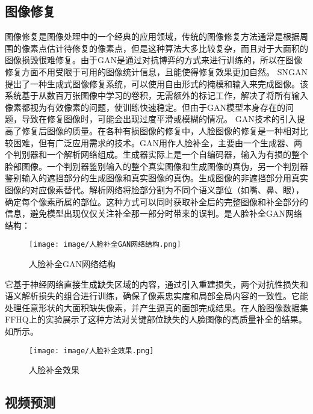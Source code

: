 \documentclass[lang=cn,a4paper,12pt,bibend=biber]{GAN}
\begin{document}
\subsection{图像修复}

图像修复是图像处理中的一个经典的应用领域，传统的图像修复方法通常是根据周围的像素点估计待修复的像素点，但是这种算法大多比较复杂，而且对于大面积的图像损毁很难修复。由于GAN是通过对抗博弈的方式来进行训练的，所以在图像修复方面不用受限于可用的图像统计信息，且能使得修复效果更加自然。
SNGAN提出了一种生成式图像修复系统，可以使用自由形式的掩模和输入来完成图像。该系统基于从数百万张图像中学习的卷积，无需额外的标记工作，解决了将所有输入像素都视为有效像素的问题，使训练快速稳定。但由于GAN模型本身存在的问题，导致在修复图像时，可能会出现过度平滑或模糊的情况。
GAN技术的引入提高了修复后图像的质量。在各种有损图像的修复中，人脸图像的修复是一种相对比较困难，但有广泛应用需求的技术。GAN用作人脸补全，主要由一个生成器、两个判别器和一个解析网络组成。生成器实际上是一个自编码器，输入为有损的整个脸部图像。一个判别器鉴别输入的整个真实图像和生成图像的真伪，另一个判别器鉴别输入的遮挡部分的生成图像和真实图像的真伪。生成图像的非遮挡部分用真实图像的对应像素替代。解析网络将脸部分割为不同个语义部位（如嘴、鼻、眼），确定每个像素所属的部位。这种方式可以同时获取补全后的完整图像和补全部分的信息，避免模型出现仅仅关注补全那一部分时带来的误判。是人脸补全GAN网络结构：

\begin{figure}[!htbp]
  \centering
  \texttt{[image: image/人脸补全GAN网络结构.png]}
  \caption[]{人脸补全GAN网络结构}
  \label{fig:人脸补全GAN网络结构}
\end{figure}

它基于神经网络直接生成缺失区域的内容，通过引入重建损失，两个对抗性损失和语义解析损失的组合进行训练，确保了像素忠实度和局部全局内容的一致性。它能处理任意形状的大面积缺失像素，并产生逼真的面部完成结果。在人脸图像数据集FFHQ上的实验展示了这种方法对关键部位缺失的人脸图像的高质量补全的结果。如所示。

\begin{figure}[!htbp]
  \centering
  \texttt{[image: image/人脸补全效果.png]}
  \caption[]{人脸补全效果}
  \label{fig:人脸补全效果}
\end{figure}

\subsection{视频预测}
\end{document}
